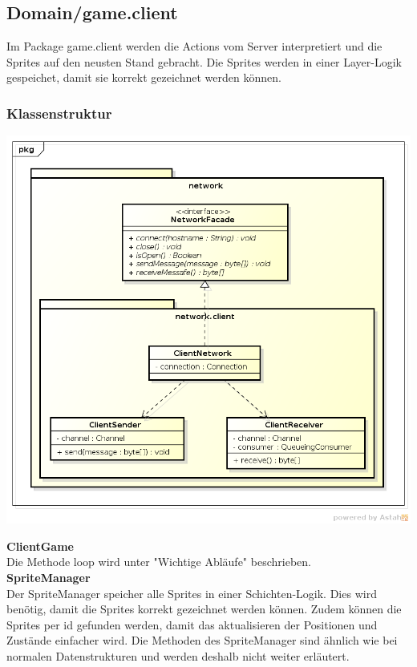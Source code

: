 \documentclass[11pt]{scrartcl}
\begin{document}
\newpage
\subsection{Domain/game.client}
Im Package game.client werden die Actions vom Server interpretiert und die Sprites auf den neusten Stand gebracht. Die Sprites werden in einer Layer-Logik gespeichet, damit sie korrekt gezeichnet werden können.

\subsubsection{Klassenstruktur}
\includegraphics[scale=0.5]{ClassDiagramGameClient}

\textbf{ClientGame}\\
Die Methode loop wird unter "Wichtige Abläufe" beschrieben.\\

\textbf{SpriteManager}\\
Der SpriteManager speicher alle Sprites in einer Schichten-Logik. Dies wird benötig, damit die Sprites korrekt gezeichnet werden können. Zudem können die Sprites per id gefunden werden, damit das aktualisieren der Positionen und Zustände einfacher wird. Die Methoden des SpriteManager sind ähnlich wie bei normalen Datenstrukturen und werden deshalb nicht weiter erläutert.

\newpage
\end{document}
